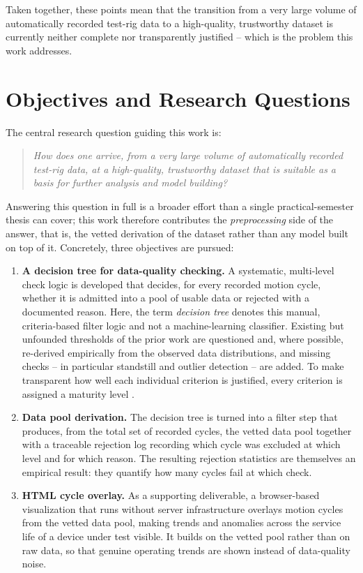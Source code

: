 Taken together, these points mean that the transition from a very large volume of
automatically recorded test-rig data to a high-quality, trustworthy dataset is currently
neither complete nor transparently justified -- which is the problem this work addresses.

\section{Objectives and Research Questions}
\label{sec:Einleitung_Zielsetzung}

The central research question guiding this work is:

\begin{quote}
\emph{How does one arrive, from a very large volume of automatically recorded test-rig
data, at a high-quality, trustworthy dataset that is suitable as a basis for further
analysis and model building?}
\end{quote}

Answering this question in full is a broader effort than a single practical-semester
thesis can cover; this work therefore contributes the \emph{preprocessing} side of the
answer, that is, the vetted derivation of the dataset rather than any model built on top
of it. Concretely, three objectives are pursued:

\begin{enumerate}
  \item \textbf{A decision tree for data-quality checking.} A systematic, multi-level
        check logic is developed that decides, for every recorded motion cycle, whether it
        is admitted into a pool of usable data or rejected with a documented reason. Here,
        the term \emph{decision tree} denotes this manual, criteria-based filter logic and
        not a machine-learning classifier. Existing but unfounded thresholds of the prior
        work are questioned and, where possible, re-derived empirically from the observed
        data distributions, and missing checks -- in particular standstill and outlier
        detection -- are added. To make transparent how well each individual criterion is
        justified, every criterion is assigned a maturity level \parencite{TODO-data-quality}.
  \item \textbf{Data pool derivation.} The decision tree is turned into a filter step that
        produces, from the total set of recorded cycles, the vetted data pool together
        with a traceable rejection log recording which cycle was excluded at which level
        and for which reason. The resulting rejection statistics are themselves an
        empirical result: they quantify how many cycles fail at which check.
  \item \textbf{HTML cycle overlay.} As a supporting deliverable, a browser-based
        visualization that runs without server infrastructure overlays motion cycles from
        the vetted data pool, making trends and anomalies across the service life of a
        device under test visible. It builds on the vetted pool rather than on raw data, so
        that genuine operating trends are shown instead of data-quality noise.
\end{enumerate}

